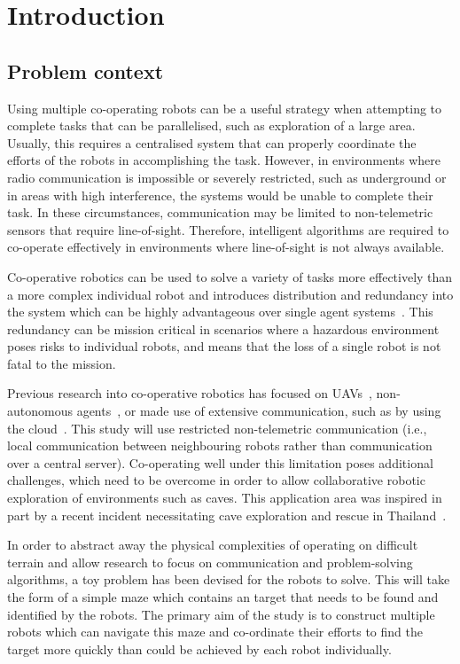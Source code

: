 
\section{Introduction}\label{introduction}
\thispagestyle{plain}
\subsection{Problem context}\label{introduction/context}
Using multiple co-operating robots can be a useful strategy when attempting
to complete tasks that can be parallelised, such as exploration of a large
area. Usually, this requires a centralised system that can properly coordinate
the efforts of the robots in accomplishing the task. However, in environments
where radio communication is impossible or severely restricted, such as underground
or in areas with high interference, the systems would be unable to complete
their task. In these circumstances, communication may be limited to
non-telemetric sensors that require line-of-sight. Therefore, intelligent
algorithms are required to co-operate effectively in environments where line-of-sight
is not always available.

Co-operative robotics can be used to solve a variety of tasks
more effectively than a more complex individual robot and introduces
distribution and redundancy into the system which can be
highly advantageous over single agent systems~\cite{dudek96}. This redundancy
can be mission critical in scenarios where a hazardous environment poses risks
to individual robots, and means that the loss of a single robot is not fatal to
the mission.

Previous research into co-operative robotics has focused on UAVs~\cite{khan18},
non-autonomous agents~\cite{jimenez18}, or made use of extensive communication,
such as by using the cloud~\cite{wensing2018cooperative}. This study will use
restricted non-telemetric communication (i.e., local communication between
neighbouring robots rather than communication over a central server). Co-operating
well under this limitation poses additional challenges, which need to be overcome
in order to allow collaborative robotic exploration of environments such as caves.
This application area was inspired in part by a recent incident necessitating cave
exploration and rescue in Thailand~\cite{bbcthailand}.

In order to abstract away the physical complexities of operating on difficult
terrain and allow research to focus on communication and problem-solving algorithms,
a toy problem has been devised for the robots to solve. This will take the form
of a simple maze which contains an target that needs to be found and identified
by the robots. The primary aim of the study is to construct multiple robots which can
navigate this maze and co-ordinate their efforts to find the target more quickly than
could be achieved by each robot individually.

